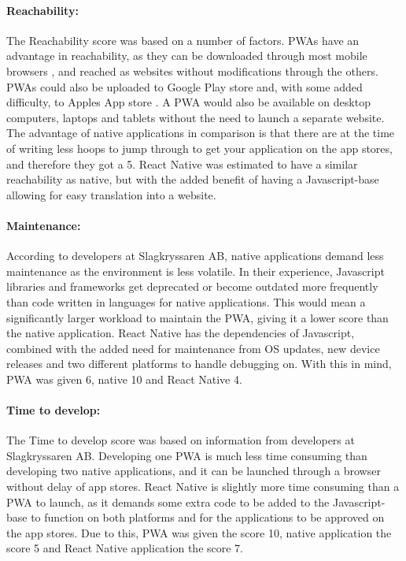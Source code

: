 \paragraph{Reachability:} The Reachability score was based on a number of factors. PWAs have an advantage in reachability, as they can be downloaded through most mobile browsers \cite{PWASupportingBrowsers}, and reached as websites without modifications through the others. PWAs could also be uploaded to Google Play store and, with some added difficulty, to Apples App store \cite{PWAonAppStore}. A PWA would also be available on desktop computers, laptops and tablets without the need to launch a separate website. The advantage of native applications in comparison is that there are at the time of writing less hoops to jump through to get your application on the app stores, and therefore they got a 5. React Native was estimated to have a similar reachability as native, but with the added benefit of having a Javascript-base allowing for easy translation into a website.

\paragraph{Maintenance:} According to developers at Slagkryssaren AB, native applications demand less maintenance as the environment is less volatile. In their experience, Javascript libraries and frameworks get deprecated or become outdated more frequently than code written in languages for native applications. This would mean a significantly larger workload to maintain the PWA, giving it a lower score than the native application. React Native has the dependencies of Javascript, combined with the added need for maintenance from OS updates, new device releases and two different platforms to handle debugging on. With this in mind, PWA was given 6, native 10 and React Native 4.

\paragraph{Time to develop:} The Time to develop score was based on information from developers at Slagkryssaren AB. Developing one PWA is much less time consuming than developing two native applications, and it can be launched through a browser without delay of app stores. React Native is slightly more time consuming than a PWA to launch, as it demands some extra code to be added to the Javascript-base to function on both platforms and for the applications to be approved on the app stores. Due to this, PWA was given the score 10, native application the score 5 and React Native application the score 7.

